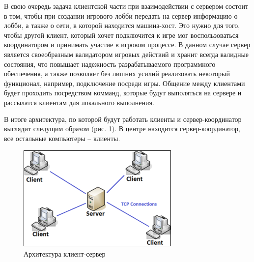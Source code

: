 В свою очередь задача клиентской части при взаимодействии с сервером состоит в том, чтобы при создании игрового лобби передать на сервер информацию о лобби, 
а также о сети, в которой находится машина-хост. Это нужно для того, чтобы другой клиент, который хочет подключится к игре мог воспользоваться координатором и принимать участие в игровом процессе.
В данном случае сервер является своеобразным валидатором игровых действий и хранит всегда валидные состояния, что повышает надежность разрабатываемого программного обеспечения, 
а также позволяет без лишних усилий реализовать некоторый функционал, например, подключение посреди игры. Общение между клиентами будет проходить посредством комманд, которые будут
выполяться на сервере и рассылатся клиентам для локального выполнения.

В итоге архитектура, по которой будут работать клиенты и сервер-координатор выглядит следущим образом (рис. \ref{sec:design:architecture:p2p}). В центре находится сервер-координатор, 
все остальные компьютеры -- клиенты.

\begin{figure}[ht]
\centering
    \includegraphics[scale=2]{attachments/p2p.png}
    \caption{Архитектура клиент-сервер}
    \label{sec:design:architecture:p2p}
\end{figure}